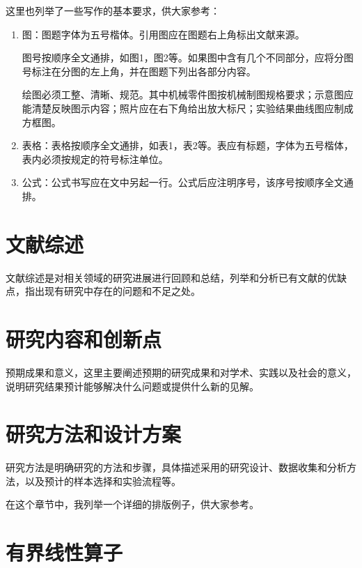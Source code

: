 \documentclass{suesreport}
\begin{document}
    这里也列举了一些写作的基本要求，供大家参考：
    \begin{enumerate}[label=\arabic*. ]
    \item 图：图题字体为五号楷体。引用图应在图题右上角标出文献来源。
    
    图号按顺序全文通排，如图1，图2等。如果图中含有几个不同部分，应将分图号标注在分图的左上角，并在图题下列出各部分内容。
    
    绘图必须工整、清晰、规范。其中机械零件图按机械制图规格要求；示意图应能清楚反映图示内容；照片应在右下角给出放大标尺；实验结果曲线图应制成方框图。
    \item 表格：表格按顺序全文通排，如表1，表2等。表应有标题，字体为五号楷体，表内必须按规定的符号标注单位。
    \item 公式：公式书写应在文中另起一行。公式后应注明序号，该序号按顺序全文通排。
    \end{enumerate}
    \section{文献综述}
    文献综述是对相关领域的研究进展进行回顾和总结，列举和分析已有文献的优缺点，指出现有研究中存在的问题和不足之处。
    \section{研究内容和创新点}
    预期成果和意义，这里主要阐述预期的研究成果和对学术、实践以及社会的意义，说明研究结果预计能够解决什么问题或提供什么新的见解。
    \section{研究方法和设计方案}
    研究方法是明确研究的方法和步骤，具体描述采用的研究设计、数据收集和分析方法，以及预计的样本选择和实验流程等。

    在这个章节中，我列举一个详细的排版例子，供大家参考。
    \section{有界线性算子}
\end{document}
